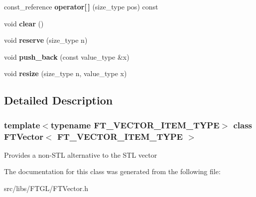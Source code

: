\begin{DoxyCompactItemize}
\item 
\hypertarget{class_f_t_vector_a3da21c8d8b89ab5f0ad2d4db5fef89c5}{
const\_\-reference {\bfseries operator\mbox{[}$\,$\mbox{]}} (size\_\-type pos) const }
\label{class_f_t_vector_a3da21c8d8b89ab5f0ad2d4db5fef89c5}

\item 
\hypertarget{class_f_t_vector_a67f25dc63f17ffa9d7cc12c11175e900}{
void {\bfseries clear} ()}
\label{class_f_t_vector_a67f25dc63f17ffa9d7cc12c11175e900}

\item 
\hypertarget{class_f_t_vector_a148e3c1116a60d9c3edd787936e0df27}{
void {\bfseries reserve} (size\_\-type n)}
\label{class_f_t_vector_a148e3c1116a60d9c3edd787936e0df27}

\item 
\hypertarget{class_f_t_vector_a791d950e681867166b7afaca20c72722}{
void {\bfseries push\_\-back} (const value\_\-type \&x)}
\label{class_f_t_vector_a791d950e681867166b7afaca20c72722}

\item 
\hypertarget{class_f_t_vector_a44869ccb17027d3880c5b5054c325dba}{
void {\bfseries resize} (size\_\-type n, value\_\-type x)}
\label{class_f_t_vector_a44869ccb17027d3880c5b5054c325dba}

\end{DoxyCompactItemize}


\subsection{Detailed Description}
\subsubsection*{template$<$typename FT\_\-VECTOR\_\-ITEM\_\-TYPE$>$ class FTVector$<$ FT\_\-VECTOR\_\-ITEM\_\-TYPE $>$}

Provides a non-\/STL alternative to the STL vector 

The documentation for this class was generated from the following file:\begin{DoxyCompactItemize}
\item 
src/libs/FTGL/FTVector.h\end{DoxyCompactItemize}
